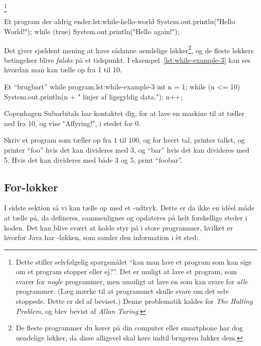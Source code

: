         \footnote{Dette stiller selvfølgelig spørgsmålet ``kan man
        lave et program som kan sige om et program stopper eller
        ej?''. Det er muligt at lave et program, som svarer for
        \emph{nogle} programmer, men umuligt at lave en som kan svare
        for \emph{alle} programmer.  (Læg mærke til at programmet
        skulle svare om det selv stoppede. Dette er del af beviset.)
        Denne problematik kaldes for \emph{The Halting Problem}, og
        blev bevist af \emph{Allan Turing}.}

		\begin{JavaCode}{Et program der aldrig ender.}{lst:while-hello-world}
			System.out.println("Hello World!");
			while (true) {
				System.out.println("Hello again!");
			}
		\end{JavaCode}

        Det giver sjældent mening at have sådanne uendelige
        løkker\footnote{De fleste programmer du kører på din computer
        eller smartphone har dog uendelige løkker, da disse alligevel
        skal køre indtil brugeren lukker dem.}, og de fleste løkkers
        betingelser blive \emph{falske} på et tidspunkt. I
        eksempel~\ref{lst:while-example-3} kan ses hvordan man kan
        tælle op fra 1 til 10.

		\begin{JavaCode}{Et ``brugbart'' while program.}{lst:while-example-3}
			int n = 1;
			while (n <= 10) {
				System.out.println(n + " linjer af ligegyldig data.");
				n++;
			}
		\end{JavaCode}

		\begin{exercise}
			Copenhagen Suborbitals har kontaktet dig, for at lave en maskine til
			at tæller ned fra 10, og vise "Affyring!", i stedet for 0.
		\end{exercise}

		\begin{exercise}
			Skriv et program som tæller op fra \(1\) til \(100\), og for hvert
			tal, printer tallet, og printer ``foo'' hvis det kan divideres med 3,
			og ``bar'' hvis det kan divideres med 5. Hvis det kan divideres med
			både 3 og 5, print ``foobar''.
		\end{exercise}

	\subsection{For-løkker}

		I sidste sektion så vi kan tælle op med et -udtryk.
		Dette er da ikke en idéel måde at tælle på, da 
		defineres, sammenlignes og opdateres på helt forskellige steder i koden.
		Det kan blive svært at holde styr på i store programmer, hvilket er
		hvorfor Java har -løkken, som samler den information i
		èt sted: 

